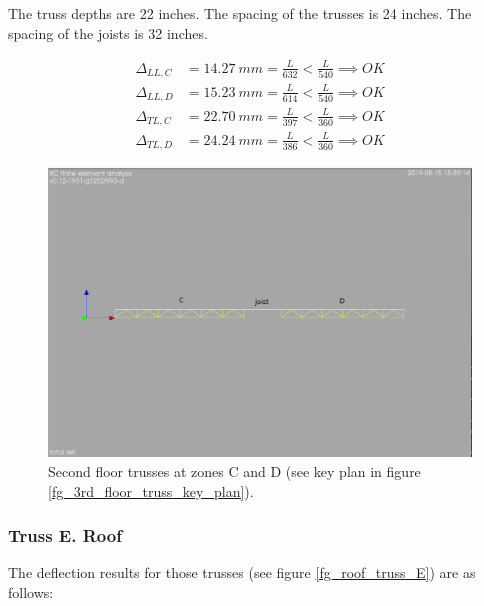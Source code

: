 \noindent The truss depths are 22 inches. The spacing of the trusses is 24 inches. The spacing of the joists is 32 inches. 

\begin{align}
\Delta_{LL,C} &= 14.27\ mm= \frac{L}{632} < \frac{L}{540} \implies OK \\
\Delta_{LL,D} &= 15.23\ mm= \frac{L}{614} < \frac{L}{540} \implies OK \\
\Delta_{TL,C} &= 22.70\ mm= \frac{L}{397} < \frac{L}{360} \implies OK \\
\Delta_{TL,D} &= 24.24\ mm= \frac{L}{386} < \frac{L}{360} \implies OK
\end{align}

\begin{figure}
  \begin{center}
  \includegraphics[width=120mm]{figures/2nd_floor_truss_CD}
  \end{center}
  \caption{Second floor trusses at zones C and D (see key plan in figure \ref{fg_3rd_floor_truss_key_plan}).}\label{fg_2nd_floor_truss_CD}
\end{figure}

\subsubsection{Truss E. Roof}
The deflection results for those trusses (see figure \ref{fg_roof_truss_E}) are as follows:

